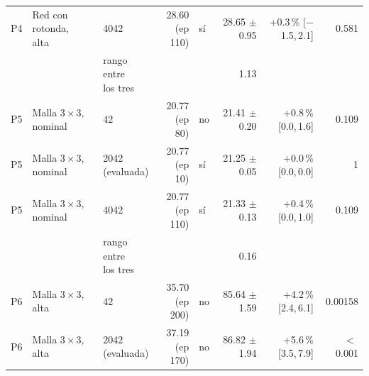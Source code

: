 \begin{table}[H]
\begin{tabular}{lllrlrrr}
P4 & \makecell[l]{Red con rotonda,\\{}alta} & 4042 & \makecell[r]{28.60\\{}(ep 110)} & sí & \makecell[r]{28.65\\{}$\pm$ 0.95} & \makecell[r]{+0.3\,\%\\{}[$-$1.5,\,2.1]} & 0.581 \\
 & & \makecell[l]{rango entre\\{}los tres} & & & 1.13 & & \\
P5 & \makecell[l]{Malla $3 \times 3$,\\{}nominal} & 42 & \makecell[r]{20.77\\{}(ep 80)} & no & \makecell[r]{21.41\\{}$\pm$ 0.20} & \makecell[r]{+0.8\,\%\\{}[0.0,\,1.6]} & 0.109 \\
P5 & \makecell[l]{Malla $3 \times 3$,\\{}nominal} & \makecell[l]{2042\\{}(evaluada)} & \makecell[r]{20.77\\{}(ep 10)} & sí & \makecell[r]{21.25\\{}$\pm$ 0.05} & \makecell[r]{+0.0\,\%\\{}[0.0,\,0.0]} & 1 \\
P5 & \makecell[l]{Malla $3 \times 3$,\\{}nominal} & 4042 & \makecell[r]{20.77\\{}(ep 110)} & sí & \makecell[r]{21.33\\{}$\pm$ 0.13} & \makecell[r]{+0.4\,\%\\{}[0.0,\,1.0]} & 0.109 \\
 & & \makecell[l]{rango entre\\{}los tres} & & & 0.16 & & \\
P6 & \makecell[l]{Malla $3 \times 3$,\\{}alta} & 42 & \makecell[r]{35.70\\{}(ep 200)} & no & \makecell[r]{85.64\\{}$\pm$ 1.59} & \makecell[r]{+4.2\,\%\\{}[2.4,\,6.1]} & 0.00158 \\
P6 & \makecell[l]{Malla $3 \times 3$,\\{}alta} & \makecell[l]{2042\\{}(evaluada)} & \makecell[r]{37.19\\{}(ep 170)} & no & \makecell[r]{86.82\\{}$\pm$ 1.94} & \makecell[r]{+5.6\,\%\\{}[3.5,\,7.9]} & $<$\,0.001 \\

\end{tabular}
\end{table}
